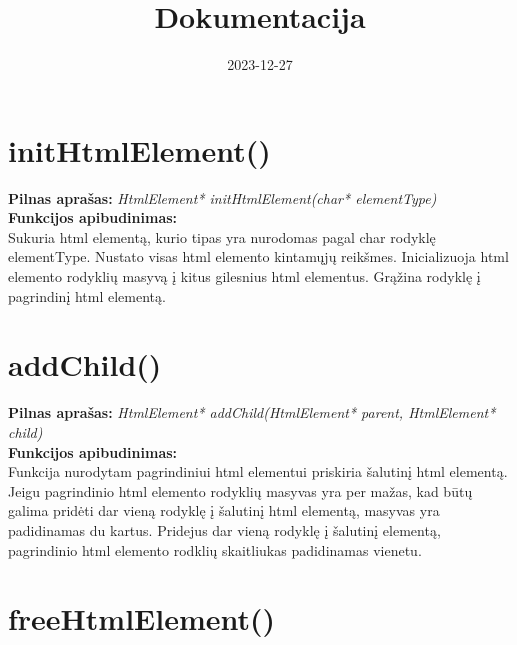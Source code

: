 \documentclass[a4paper,10pt]{article}
\title{Dokumentacija}
\author{}
\date{2023-12-27}
\begin{document}
\maketitle

\section*{initHtmlElement()}
\textbf{Pilnas aprašas:} \textit{HtmlElement* initHtmlElement(char* elementType)}
\\\textbf{Funkcijos apibudinimas:}
\\Sukuria html elementą, kurio tipas yra nurodomas pagal char rodyklę elementType. 
Nustato visas html elemento kintamųjų reikšmes. Inicializuoja html elemento rodyklių 
masyvą į kitus gilesnius html elementus. Grąžina rodyklę į pagrindinį html elementą.

\section*{addChild()}
\textbf{Pilnas aprašas:} \textit{HtmlElement* addChild(HtmlElement* parent, HtmlElement* child)}
\\\textbf{Funkcijos apibudinimas:}
\\Funkcija nurodytam pagrindiniui html elementui priskiria šalutinį html elementą. Jeigu pagrindinio html elemento rodyklių masyvas
yra per mažas, kad būtų galima pridėti dar vieną rodyklę į šalutinį html elementą, masyvas yra padidinamas du kartus. Pridejus dar vieną
rodyklę į šalutinį elementą, pagrindinio html elemento rodklių skaitliukas padidinamas vienetu.

\section*{freeHtmlElement()}
\end{document}
